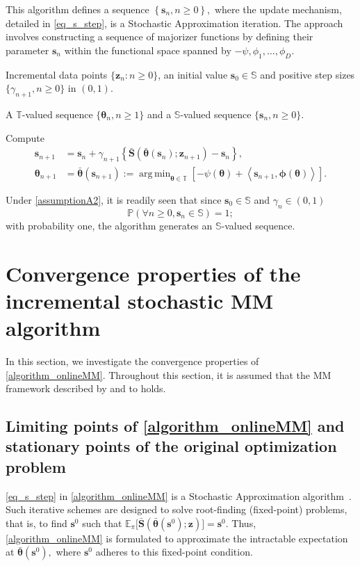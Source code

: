 \documentclass{article}
\def\phib        {{\sbmm{\phi}}\XS}        \def\Phib       {{\sbmm{\Phi}}\XS}
\def\XS{\xspace}
\def\sbmm#1{\ensuremath{\boldsymbol{#1}}}
\def\eqdef{:=}
\def\PE{\mathbb{E}_\pi} %
\def\param{\vtheta}
\def\barparam{\bar{\param}}
\newcommand{\pscal}[2]{\left\langle#1,#2\right\rangle} %
\def\bars{\bar{\vS}}
\newcommand{\ooint}[1]{\left(#1\right)}%
\def\rvz{{\mathbf{z}}}
\def\vtheta{{\bm{\theta}}}
\def\vs{{\bm{s}}}
\def\vS{{\bm{S}}}
\def\vz{{\bm{z}}}
\def\sP{{\mathbb{P}}}
\def\sS{{\mathbb{S}}}
\def\sT{{\mathbb{T}}}
\DeclareMathOperator*{\argmin}{arg\,min}
\begin{document}
This algorithm defines a sequence $\left\{\vs_n, n \geq 0\right\},$ where the update mechanism, detailed in \cref{eq_s_step}, is a Stochastic Approximation iteration. The approach involves constructing a sequence of majorizer functions by defining their parameter $\vs_n$ within the functional space spanned by $-\psi, \phi_1, \ldots, \phi_D.$
\begin{algorithm}[H]
\caption{Incremental MM algorithm}
\label{algorithm_onlineMM}
\begin{algorithmic}[1]
    \Require Incremental data points $\{\vz_{n}:n \ge 0\}$, an initial value $\vs_0 \in \sS$ and positive step sizes $\{\gamma_{n+1}, n \geq 0 \}$ in  $\ooint{0,1}$.
    
    \Ensure A $\sT$-valued sequence $\{\param_n, n \ge 1\}$ and a $\sS$-valued sequence $\{\vs_n, n \ge 0\}$.

        \State Compute 
        \begin{align}
        \vs_{n+1} & =\vs_{n}+\gamma_{n+1}\left\{ \bars\left(\barparam(\vs_{n});\vz_{n+1}\right)-\vs_{n}\right\},     \label{eq_s_step}\\
        \vtheta_{n+1} &= \barparam(\vs_{n+1}) \eqdef \argmin_{\vtheta \in \sT}[- \psi(\vtheta) + \pscal{\vs_{n+1}}{\phib(\vtheta)}].\label{eq_argmin_step}
        \end{align}
    \EndFor
\end{algorithmic}
\end{algorithm}

Under \cref{assumptionA2}, it is readily seen that since $\vs_0 \in \sS$ and $\gamma_n \in \ooint{0,1}$
\begin{equation}\label{eq:sninS}
 \sP\left( \forall n \geq 0, \vs_n \in \sS\right) =1;   
\end{equation} with probability one, the algorithm generates an $\sS$-valued sequence.

\section{Convergence properties of the incremental stochastic MM algorithm}\label{sec_convergence_issues}
In this section, we investigate the convergence properties of \cref{algorithm_onlineMM}. Throughout this section, it is assumed that the MM framework described by  and  to  holds.

\subsection{Limiting points of \texorpdfstring{\cref{algorithm_onlineMM}}{Algorithm~\ref*{algorithm_onlineMM}} and stationary points of the original optimization problem}
\cref{eq_s_step} in \cref{algorithm_onlineMM} is a Stochastic Approximation algorithm~\cite{robbins_stochastic_1951}. Such iterative schemes are designed to solve root-finding (fixed-point) problems, that is, to find $\vs^0$ such that
$\PE\big[\bars(\barparam(\vs^0); \rvz)\big] = \vs^0 .$
Thus, \cref{algorithm_onlineMM} is formulated to approximate the intractable expectation at $\barparam(\vs^0),$ where $\vs^0$ adheres to this fixed-point condition. 
\end{document}
